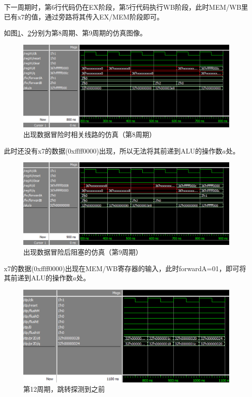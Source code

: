 \documentclass[UTF8,a4paper,autofakebold,15pt]{ctexart}
\begin{document}
下一周期时，第6行代码仍在EX阶段，第5行代码执行WB阶段，此时MEM/WB里已有x7的值，通过旁路将其传入EX/MEM阶段即可。

如图\ref{fig:label10}、\ref{fig:label11}分别为第8周期、第9周期的仿真图像。

\begin{figure}
	\centering
	\includegraphics[scale=.8]{fig10.png}
	\caption{出现数据冒险时相关线路的仿真（第8周期）}
	\label{fig:label10}
\end{figure}

此时还没有x7的数据(0xffff0000)出现，所以无法将其前递到ALU的操作数$a$处。

\begin{figure}
	\centering
	\includegraphics[scale=.8]{fig11.png}
	\caption{出现数据冒险后阻塞的仿真（第9周期）}
	\label{fig:label11}
\end{figure}

x7的数据(0xffff0000)出现在MEM/WB寄存器的输入，此时forwardA=01，即可将其前递到ALU的操作数$a$处。

\begin{figure}
	\centering
	\includegraphics[scale=.8]{fig12.png}
	\caption{第12周期，跳转探测到之前}
	\label{fig:label12}
\end{figure}
\end{document}

